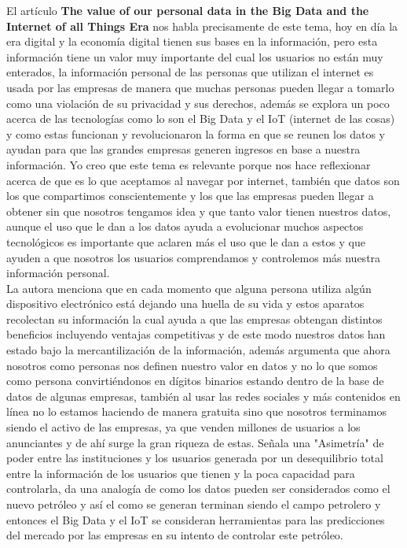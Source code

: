 \documentclass[12pt]{report}
\begin{document}
\begin{enumerate}[label=\textbf{\arabic*.}, leftmargin=*]
\begin{enumerate}[label=\textbf{\alph*.}, leftmargin=*, itemsep=1.0em]
El artículo \textbf{The value of our personal data in the Big Data and the Internet of all Things Era} nos habla precisamente de este tema, hoy en día la era digital y la economía digital tienen sus bases en la información, pero esta información tiene un valor muy importante del cual los usuarios no están muy enterados, la información personal de las personas que utilizan el internet es usada por las empresas de manera que muchas personas pueden llegar a tomarlo como una violación de su privacidad y sus derechos, además se explora un poco acerca de las tecnologías como lo son el Big Data y el IoT (internet de las cosas) y como estas funcionan y revolucionaron la forma en que se reunen los datos y ayudan para que las grandes empresas generen ingresos en base a nuestra información. Yo creo que este tema es relevante porque nos hace reflexionar acerca de que es lo que aceptamos al navegar por internet, también que datos son los que compartimos conscientemente y los que las empresas pueden llegar a obtener sin que nosotros tengamos idea y que tanto valor tienen nuestros datos, aunque el uso que le dan a los datos ayuda a evolucionar muchos aspectos tecnológicos es importante que aclaren más el uso que le dan a estos y que ayuden a que nosotros los usuarios comprendamos y controlemos más nuestra información personal.\\

La autora menciona que en cada momento que alguna persona utiliza algún dispositivo electrónico está dejando una huella de su vida y estos aparatos recolectan su información la cual ayuda a que las empresas obtengan distintos beneficios incluyendo ventajas competitivas y de este modo nuestros datos han estado bajo la mercantilización de la información, además argumenta que ahora nosotros como personas nos definen nuestro valor en datos y no lo que somos como persona convirtiéndonos en dígitos binarios estando dentro de la base de datos de algunas empresas, también al usar las redes sociales y más contenidos en línea no lo estamos haciendo de manera gratuita sino que nosotros terminamos siendo el activo de las empresas, ya que venden millones de usuarios a los anunciantes y de ahí surge la gran riqueza de estas. Señala una "Asimetría" de poder entre las instituciones y los usuarios generada por un desequilibrio total entre la información de los usuarios que tienen y la poca capacidad para controlarla, da una analogía de como los datos pueden ser considerados como el nuevo petróleo y así el como se generan terminan siendo el campo petrolero y entonces el Big Data y el IoT se consideran herramientas para las predicciones del mercado por las empresas en su intento de controlar este petróleo.\\


\end{enumerate}
\end{enumerate}
\end{document}
